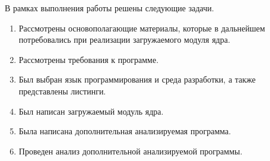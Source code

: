 \Conclusion %

В рамках выполнения работы решены следующие задачи.

\begin{enumerate}
	\item Рассмотрены основополагающие материалы, которые в дальнейшем потребовались при реализации загружаемого модуля ядра.
	\item Рассмотрены требования к программе.
	\item Был выбран язык программирования и среда разработки, а также представлены листинги.
	\item Был написан загружаемый модуль ядра.
	\item Была написана дополнительная анализируемая программа.
	\item Проведен анализ дополнительной анализируемой программы.
\end{enumerate}
